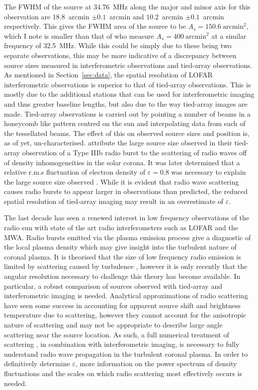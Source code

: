 The FWHM of the source at 34.76~MHz along the major and minor axis for this observation are $18.8$~arcmin $\pm 0.1$~arcmin and $10.2$~arcmin $\pm 0.1$~arcmin respectively. This gives the FWHM area of the source to be $A_s = 150.6~\mbox{arcmin}^2$, which I note is smaller than that of \cite{Kontar2017} who measure $A_s = 400~\mbox{arcmin}^2$ at a similar frequency of 32.5~MHz. While this could be simply due to these being two separate observations, this may be more indicative of a discrepancy between source sizes measured in interferometric observations and tied-array observations.
As mentioned in Section~\ref{sec:data}, the spatial resolution of LOFAR interferometric observations is superior to that of tied-array observations. This is mostly due to the additional stations that can be used for interferometric imaging and thus greater baseline lengths, but also due to the way tied-array images are made. Tied-array observations is carried out by pointing a number of beams in a honeycomb like pattern centred on the sun and interpolating data from each of the tessellated beams. The effect of this on observed source sizes and position is, as of yet, un-characterised. \cite{Kontar2017} attribute the large source size observed in their tied-array observation of a Type IIIb radio burst to the scattering of radio waves off of density inhomogeneities in the solar corona. It was later determined that a relative r.m.s fluctuation of electron density of $\varepsilon = 0.8$ was necessary to explain the large source size observed \cite{Kontar2019}. While it is evident that radio wave scattering causes radio bursts to appear larger in observations than predicted, the reduced spatial resolution of tied-array imaging may result in an overestimate of $\varepsilon$.

The last decade has seen a renewed interest in low frequency observations of the radio sun with state of the art radio interferometers such as LOFAR and the MWA. Radio bursts emitted via the plasma emission process give a diagnostic of the local plasma density which may give insight into the turbulent nature of coronal plasma. It is theorised that the size of low frequency radio emission is limited by scattering caused by turbulence \citep{Bastian1994}, however it is only recently that the angular resolution necessary to challenge this theory has become available. In particular, a robust comparison of sources observed with tied-array and interferometric imaging is needed. Analytical approximations of radio scattering \citep[e.g.][]{Chrysaphi2018,Gordovskyy2019,Sharma2020} have seen some success in accounting for apparent source shift and brightness temperature due to scattering, however they cannot account for the anisotropic nature of scattering and may not be appropriate to describe large angle scattering near the source location. As such, a full numerical treatment of scattering \citep[e.g.][]{Thejappa2008, Bian2019, Kontar2019}, in combination with interferometric imaging, is necessary to fully understand radio wave propagation in the turbulent coronal plasma. In order to definitively determine $\varepsilon$, more information on the power spectrum of density fluctuations and the scales on which radio scattering most effectively occurs is needed.

